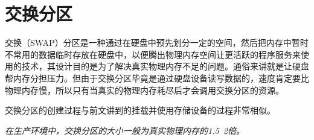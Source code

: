 \documentclass[UTF8]{article}
\begin{document}
	\section{交换分区}
	
	交换（SWAP）分区是一种通过在硬盘中预先划分一定的空间，然后把内存中暂时不常用的数据临时存放在硬盘中，以便腾出物理内存空间让更活跃的程序服务来使用的技术，其设计目的是为了解决真实物理内存不足的问题。通俗来讲就是让硬盘帮内存分担压力。但由于交换分区毕竟是通过硬盘设备读写数据的，速度肯定要比物理内存慢，所以只有当真实的物理内存耗尽后才会调用交换分区的资源。
	
	交换分区的创建过程与前文讲到的挂载并使用存储设备的过程非常相似。
	
	\emph{在生产环境中，交换分区的大小一般为真实物理内存的1.5~2倍。}
	
	\nocite{L:linuxprobe}
	
	
	
	
	
	
\end{document}
